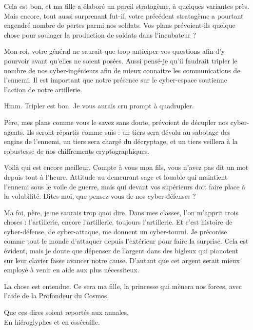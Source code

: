 \begin{drama}
  \roispeaks Cela est bon, et ma fille a élaboré un pareil stratagème, à quelques variantes près. Mais encore, tout aussi surprenant fut-il, votre précédent stratagème a pourtant engendré nombre de pertes parmi nos soldats. Vos plans prévoient-ils quelque chose pour soulager la production de soldats dans l’incubateur ?

  \generalspeaks Mon roi, votre général ne saurait que trop anticiper vos questions afin d’y pourvoir avant qu’elles ne soient posées. Aussi pensé-je qu’il faudrait tripler le nombre de nos cyber-ingénieurs afin de mieux connaitre les communications de l’ennemi. Il est important que notre présence sur le cyber-espace soutienne l’action de notre artillerie.

  \roispeaks Hmm. Tripler est bon. Je vous aurais cru prompt à quadrupler.

  \princessespeaks Père, mes plans comme vous le savez sans doute, prévoient de décupler nos cyber-agents. Ils seront répartis comme suis : un tiers sera dévolu au sabotage des engins de l’ennemi, un tiers sera chargé du décryptage, et un tiers veillera à la robustesse de nos chiffrements cryptographiques.


  \roispeaks Voilà qui est encore meilleur. Compte à vous mon fils, vous n’avez pas dit un mot depuis tout à l’heure. Attitude au demeurant sage et louable qui maintient l’ennemi sous le voile de guerre, mais qui devant vos supérieurs doit faire place à la volubilité. Dites-moi, que pensez-vous de nos cyber-défenses ?

  \elenaspeaks Ma foi, père, je ne saurais trop quoi dire. Dans mes classes, l’on m’apprit trois choses : l’artillerie, encore l’artillerie, toujours l’artillerie. Et c’est histoire de cyber-défense, de cyber-attaque, me donnent un cyber-tourni. Je préconise comme tout le monde d’attaquer depuis l’extérieur pour faire la surprise. Cela est évident, mais je doute que dépenser de l’argent dans des bigleux qui pianotent sur leur clavier fasse avancer notre cause. D’autant que cet argent serait mieux employé à venir en aide aux plus nécessiteux.

  \roispeaks La chose est entendue. Ce sera ma fille, la princesse \princesse{} qui mènera nos forces, avec l’aide de la Profondeur du Cosmos.

  \begin{minipage}[t]{\linewidth}
    Que ces dires soient reportés aux annales,\\
    En hiéroglyphes et en ossécaille.
  \end{minipage}


\end{drama}

